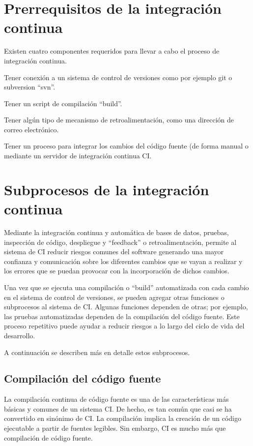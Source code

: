 \section{Prerrequisitos de la integración continua}
Existen cuatro componentes requeridos para llevar a cabo el proceso de integración continua.
\begin{compactitem}
    \item Tener conexión a un sistema de control de versiones como por ejemplo git o subversion ``svn''.
    \item Tener un script de compilación ``build''.
    \item Tener algún tipo de mecanismo de retroalimentación, como una dirección de correo electrónico.
    \item Tener un proceso para integrar los cambios del código fuente (de forma manual o mediante un servidor de integración continua CI.
\end{compactitem}

\section{Subprocesos de la integración continua}
Mediante la integración continua y automática de bases de datos, pruebas, inspección de código, despliegue y ``feedback'' o retroalimentación, permite al sistema de CI reducir riesgos comunes del software generando una mayor confianza y comunicación sobre los diferentes cambios que se vayan a realizar y los errores que se puedan provocar con la incorporación de dichos cambios. 

Una vez que se ejecuta una compilación o ``build'' automatizada con cada cambio en el sistema de control de versiones, se pueden agregar otras funciones o subprocesos al sistema de CI. Algunas funciones dependen de otras; por ejemplo, las pruebas automatizadas dependen de la compilación del código fuente. Este proceso repetitivo puede ayudar a reducir riesgos a lo largo del ciclo de vida del desarrollo.

A continuación se describen más en detalle estos subprocesos.

\subsection{Compilación del código fuente}
La compilación continua de código fuente es una de las características más básicas y comunes de un sistema CI. De hecho, es tan común que casi se ha convertido en sinónimo de CI. La compilación implica la creación de un código ejecutable a partir de fuentes legibles. Sin embargo, CI es mucho más que compilación de código fuente.

